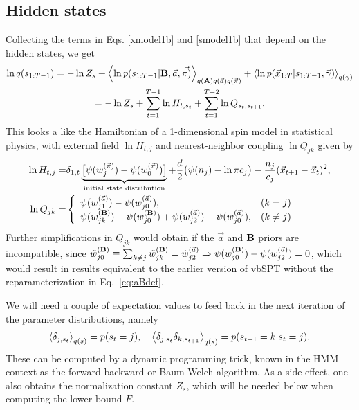 \subsection{Hidden states}
Collecting the terms in Eqs. \eqref{xmodel1b} and \eqref{smodel1b} that
depend on the hidden states, we get
\begin{multline}\label{VBE_qs}
 \ln q(s_{1:T-1})=
-\ln Z_s+\left\langle \ln p(s_{1:T-1}|\mathbf{B},\vec{a},\vec{\pi)}\right\rangle_{q(\mathbf{A})q(\vec a)q(\vec\pi)}
+\left\langle \ln p(\vec{x}_{1:T}|s_{1:T-1},\vec{\gamma})\right\rangle_{q(\vec\gamma)}\\
=-\ln Z_s +\sum_{t=1}^{T-1}\ln H_{t,s_t}+\sum_{t=1}^{T-2}\ln Q_{s_t,s_{t+1}}.
\end{multline}
This looks a like the Hamiltonian of a 1-dimensional spin model in
statistical physics, with external field $\ln H_{t,j}$ and
nearest-neighbor coupling $\ln Q_{jk}$ given by
\begin{align}
  \ln H_{t,j}=& \delta_{1,t}\underbrace{
    \big[\psi(w_j^{(\vec\pi)})-\psi(w_0^{(\vec\pi)})\big]
  }_{\text{initial state distribution}}
  +\frac d2\big(\psi(n_j)-\ln \pi c_j\big)-\frac{n_j}{c_j}(\vec{x}_{t+1}-\vec{x}_t)^2,
  \\
  \ln Q_{jk}=&\left\{
  \begin{array}{ll}
  \psi(w_{j1}^{(\vec{a})})-\psi(w_{j0}^{(\vec{a})}),&(k=j)\\
  \psi(w_{jk}^{(\mathbf{B})})-\psi(w_{j0}^{(\mathbf{B})})
  +
  \psi(w_{j2}^{(\vec{a})})-\psi(w_{j0}^{(\vec{a})})
  ,&(k \ne j)
  \end{array}\right.
\end{align}
Further simplifications in $Q_{jk}$ would obtain if the $\vec a$ and
$\mathbf{B}$ priors are incompatible, since $\tilde
w_{j0}^{(\mathbf{B})}\equiv \sum_{k\ne j}\tilde
w_{jk}^{(\mathbf{B})}= \tilde
w_{j2}^{(\vec{a})} \Rightarrow \psi(w_{j0}^{(\mathbf{B})})
-\psi(w_{j2}^{(\vec{a})})=0$, which would result in results equivalent
to the earlier version of vbSPT without the reparameterization in
Eq.~\eqref{eq:aBdef}.

We will need a couple of expectation values to feed back in the next
iteration of the parameter distributions, namely
\begin{equation}
  \left\langle \delta_{j,s_t}\right\rangle_{q(s)}=p(s_t=j),\quad
  \left\langle \delta_{j,s_t}\delta_{k,s_{t+1}}\right\rangle_{q(s)}=p(s_{t+1}=k|s_t=j).
\end{equation}
These can be computed by a dynamic programming
trick\cite{Bishop2006,Mackay1997,Beal2003}, known in the HMM context
as the forward-backward or Baum-Welch
algorithm\cite{Rabiner1989,Baum1972}. As a side effect, one also
obtains the normalization constant $Z_s$, which will be needed below
when computing the lower bound $F$.

